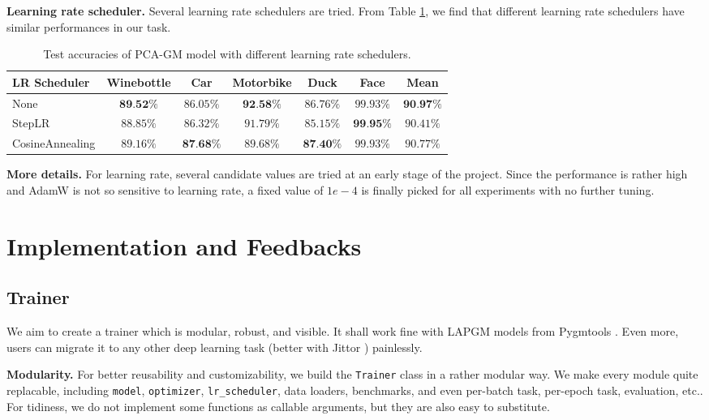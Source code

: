 \documentclass[a4paper]{article}
\begin{document}
\textbf{Learning rate scheduler.}
Several learning rate schedulers are tried. From Table \ref{tab:scheduler}, we find that different learning rate schedulers have similar performances in our task.

\begin{table}[htbp]
    \centering
    \begin{tabular}{lcccccc}
        \toprule
        LR Scheduler& Winebottle& Car& Motorbike& Duck& Face& Mean\\
        \midrule
        None& $\textbf{89.52\%}$& $86.05\%$& $\textbf{92.58\%}$& $86.76\%$& $99.93\%$& $\textbf{90.97\%}$\\
        StepLR& $88.85\%$& $86.32\%$& $91.79\%$& $85.15\%$& $\textbf{99.95\%}$& $90.41\%$\\
        CosineAnnealing& $89.16\%$& $\textbf{87.68\%}$& $89.68\%$& $\textbf{87.40\%}$& $99.93\%$& $90.77\%$\\
        \bottomrule
        
    \end{tabular}
    \caption{Test accuracies of PCA-GM model with different learning rate schedulers.}
    \label{tab:scheduler}
\end{table}

\textbf{More details.}
For learning rate, several candidate values are tried at an early stage of the project. Since the performance is rather high and AdamW is not so sensitive to learning rate, a fixed value of $1e-4$ is finally picked for all experiments with no further tuning.



\section{Implementation and Feedbacks}

\subsection{Trainer}
We aim to create a trainer which is modular, robust, and visible. It shall work fine with LAPGM models from Pygmtools \cite{pygmtools}. Even more, users can migrate it to any other deep learning task (better with Jittor \cite{jittor}) painlessly.

\textbf{Modularity.}
For better reusability and customizability, we build the \texttt{Trainer} class in a rather modular way. We make every module quite replacable, including \texttt{model}, \texttt{optimizer}, \texttt{lr\_scheduler}, data loaders, benchmarks, and even per-batch task, per-epoch task, evaluation, etc.. For tidiness, we do not implement some functions as callable arguments, but they are also easy to substitute.
\end{document}

